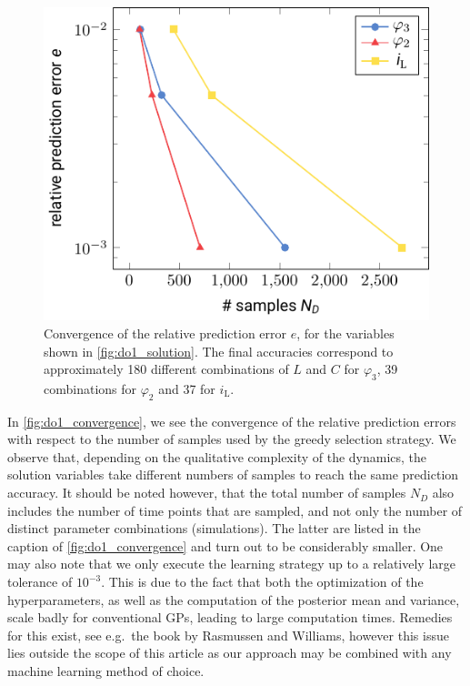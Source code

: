 \documentclass[AMA,STIX1COL]{WileyNJD-v2}
\newcommand{\mr}[1]{\mathrm{#1}}
\begin{document}
\begin{figure}[b]
    \begin{center}
        \includegraphics[width=.4\textwidth]{do1_convergence}
    \end{center}
    \caption{Convergence of the relative prediction error $e$, for the variables shown in \autoref{fig:do1_solution}. The final accuracies correspond to approximately 180 different combinations of $L$ and $C$ for $\varphi_3$, 39 combinations for $\varphi_2$ and 37 for $i_\mr{L}$.}
    \label{fig:do1_convergence}
\end{figure}
In \autoref{fig:do1_convergence}, we see the convergence of the relative prediction errors with respect to the number of samples used by the greedy selection strategy. We observe that, depending on the qualitative complexity of the dynamics, the solution variables take different numbers of samples to reach the same prediction accuracy. It should be noted however, that the total number of samples $N_D$ also includes the number of time points that are sampled, and not only the number of distinct parameter combinations (simulations). The latter are listed in the caption of \autoref{fig:do1_convergence} and turn out to be considerably smaller. One may also note that we only execute the learning strategy up to a relatively large tolerance of $10^{-3}$. This is due to the fact that both the optimization of the hyperparameters, as well as the computation of the posterior mean and variance, scale badly for conventional GPs, leading to large computation times. Remedies for this exist, see e.g.~the book by Rasmussen and Williams\cite{rasmussen2006}, however this issue lies outside the scope of this article as our approach may be combined with any machine learning method of choice.
\end{document}
